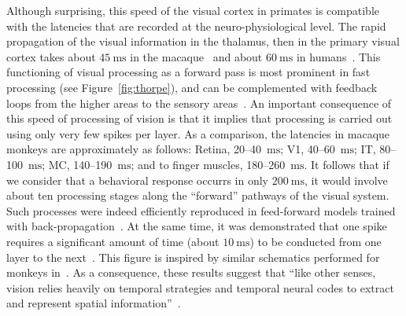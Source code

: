 \documentclass[brainsci, %
               review,accept,pdftex,moreauthors
               ]{Definitions/mdpi}
\newcommand{\ms}{\si{\milli\second}}%
\begin{document}
Although surprising, this speed of the visual cortex in primates is compatible with the latencies that are recorded at the neuro-physiological level. The rapid propagation of the visual information in the thalamus, then in the primary visual cortex takes about $45~\ms$ in the macaque~\citep{schmolesky_signal_1998} and about $60~\ms$ in humans~\citep{vanni_coinciding_2001}. This functioning of visual processing as a forward pass is most prominent in fast processing (see Figure~\ref{fig:thorpe}), and can be complemented with feedback loops from the higher areas to the sensory areas~\citep{lamme_distinct_2000}. An important consequence of this speed of processing of vision is that it implies that processing is carried out using only very few spikes per layer. As a comparison, the latencies in macaque monkeys are approximately as follows: Retina, 20--40~$\ms$; V1, 40--60~$\ms$; IT, 80--100~$\ms$; MC, 140--190~$\ms$; and to finger muscles, 180--260~$\ms$.  It follows that if we consider that a behavioral response occurrs in only $200~\ms$, it would involve about ten processing stages along the ``forward'' pathways of the visual system. Such processes were indeed efficiently reproduced in feed-forward models trained with back-propagation~\citep{serre_feedforward_2007,jeremie_ultrafast_2022}. At the same time, it was demonstrated that one spike requires a significant amount of time (about $10~\ms$) to be conducted from one layer to the next~\citep{nowak_timing_1997,thorpe_seeking_2001}.  This figure is inspired by similar schematics performed for monkeys in~\citep{thorpe_seeking_2001}. As a consequence, these results suggest that ``like other senses, vision relies heavily on temporal strategies and temporal neural codes to extract and represent spatial information''~\citep{rucci_temporal_2018}.


\end{document}
